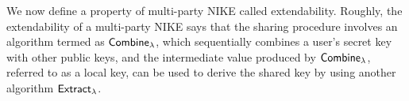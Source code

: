 We now define a property of multi-party NIKE called extendability.
Roughly, the extendability of a multi-party NIKE says that the sharing procedure involves an algorithm termed as $\mathsf{Combine}_{\lambda}$, which sequentially combines a user's secret key with other public keys, and the intermediate value produced by $\mathsf{Combine}_{\lambda}$, referred to as a local key, can be used to derive the shared key by using another algorithm $\mathsf{Extract}_{\lambda}$. %
